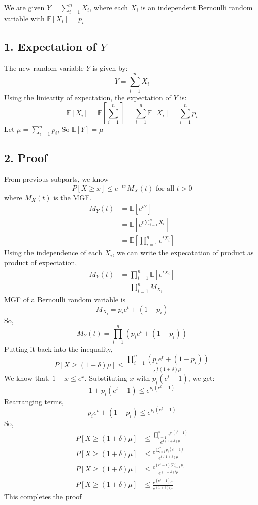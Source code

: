 \begin{solution}
	We are given $Y = \sum^n_{i=1}X_i$, where each $X_i$ is an independent Bernoulli random variable with $\mathds{E}[X_i] = p_i$ 
	\subsection*{1. Expectation of $Y$}
	The new random variable $Y$ is given by:
	\[Y = \sum^n_{i=1}X_i\]
	Using the liniearity of expectation, the expectation of $Y$ is:
	\[\mathds{E}[X_i] = \mathds{E}\left[\sum_{i=1}^{n}\right] = \sum_{i=1}^{n}\mathds{E}[X_i] = \sum_{i=1}^{n}p_i\]
	Let $\mu = \sum_{i=1}^{n}p_i$, So $\mathds{E}[Y]=\mu$
	\subsection*{2. Proof}
	From previous subparts, we know
	\[P[X\geq x]\leq e^{-tx}M_X(t) \text{ for all } t>0\]
	where $M_X(t)$ is the MGF.
	\begin{align}
		M_Y(t) & = \mathds{E}[e^{tY}]\\
		& = \mathds{E}[e^{t\sum_{i=1}^{n}X_i}]\\
		& = \mathds{E}\left[\prod_{i=1}^{n}e^{tX_i}\right]
	\end{align}
	Using the independence of each $X_i$, we can write the expecatation of product as product of expectation,
	\begin{align}
		M_Y(t) & = \prod_{i=1}^{n}\mathds{E}[e^{tX_i}]\\
		& = \prod_{i=1}^{n}M_{X_i}
	\end{align}
	MGF of a Bernoulli random variable is 
	\[M_{X_i} = p_ie^t+(1-p_i)\]
	So,
	\[
		M_Y(t) = \prod_{i=1}^{n}(p_ie^t+(1-p_i))
	\]
	Putting it back into the inequality,
	\[P[X\geq (1+\delta)\mu]\leq \frac{\prod_{i=1}^{n}(p_ie^t+(1-p_i))}{e^{t(1+\delta)\mu}}\]
	We know that, $1+x \leq e^x$. Substituting $x$ with $p_i(e^t-1)$, we get:
	\[1+p_i(e^t-1) \leq e^{p_i(e^t-1)}\]
	Rearranging terms,
	\[p_ie^t + (1-p_i) \leq e^{p_i(e^t-1)} \]
	So,
	\begin{align}
		P[X\geq (1+\delta)\mu] & \leq \frac{\prod_{i=1}^{n}e^{p_i(e^t-1)}}{e^{t(1+\delta)\mu}} \\
		P[X\geq (1+\delta)\mu] & \leq \frac{e^{\sum_{i=1}^{n}p_i(e^t-1)}}{e^{t(1+\delta)\mu}}\\
		P[X\geq (1+\delta)\mu] & \leq \frac{e^{(e^t-1)\sum_{i=1}^{n}p_i}}{e^{(1+\delta)t\mu}}\\
		P[X\geq (1+\delta)\mu] & \leq \frac{e^{(e^t-1)\mu}}{e^{(1+\delta)t\mu}}
	\end{align}
	This completes the proof
	
		
\end{solution}
